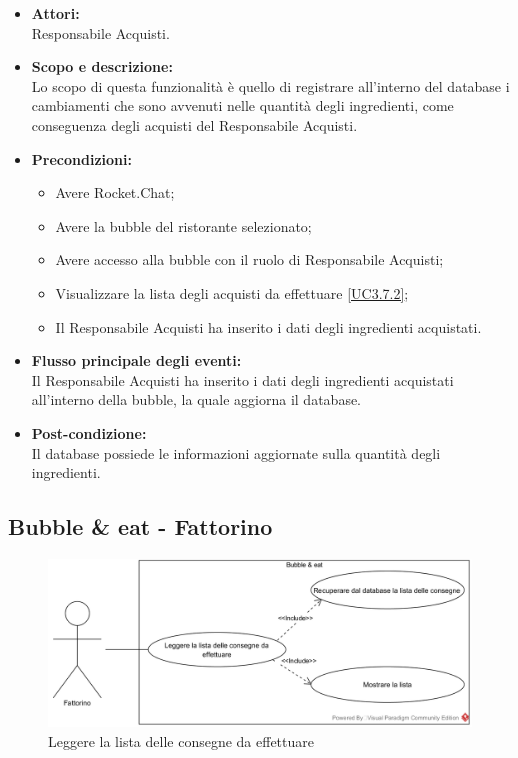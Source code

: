 
\begin{itemize}
	\item \textbf{Attori:}
	\\Responsabile Acquisti.
	\item \textbf{Scopo e descrizione:} 
	\\Lo scopo di questa funzionalità è quello di registrare all'interno del database i cambiamenti che sono avvenuti nelle quantità degli ingredienti, come conseguenza degli acquisti del Responsabile Acquisti.
	\item \textbf{Precondizioni:}
	\begin{itemize}
		\item Avere Rocket.Chat;
		\item Avere la bubble del ristorante selezionato;
		\item Avere accesso alla bubble con il ruolo di Responsabile Acquisti;
		\item Visualizzare la lista degli acquisti da effettuare \ref{UC3.7.2};
		\item Il Responsabile Acquisti ha inserito i dati degli ingredienti acquistati.
	\end{itemize}
	\item \textbf{Flusso principale degli eventi:}
	\\Il Responsabile Acquisti ha inserito i dati degli ingredienti acquistati all'interno della bubble, la quale aggiorna il database.
	\item \textbf{Post-condizione:}
	\\Il database possiede le informazioni aggiornate sulla quantità degli ingredienti.
\end{itemize}

\subsection{Bubble \& eat - Fattorino}


\begin{figure}[H]
	\centering
	\includegraphics[width=15cm]{../../documenti/AnalisiDeiRequisiti/Diagrammi_img/uc3_9.png}
	\caption{\UCCaption{} Leggere la lista delle consegne da effettuare}
\end{figure}

